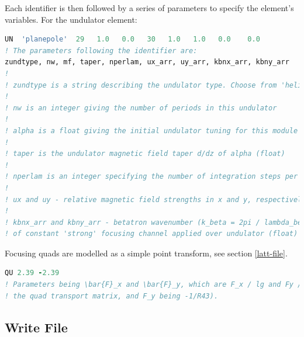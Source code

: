\documentclass[12pt]{article}%
\begin{document}
Each identifier is then followed by a series of parameters to specify the element's variables. For the undulator element:

\begin{lstlisting}[language=fortran, caption=Undulator identifier and specification]
UN  'planepole'  29   1.0   0.0   30   1.0   1.0   0.0    0.0
! The parameters following the identifier are:
zundtype, nw, mf, taper, nperlam, ux_arr, uy_arr, kbnx_arr, kbny_arr
!
! zundtype is a string describing the undulator type. Choose from 'helical', 'planepole', 'curved', or '' (blank string)
!
! nw is an integer giving the number of periods in this undulator
!
! alpha is a float giving the initial undulator tuning for this module aw/aw0,
!
! taper is the undulator magnetic field taper d/dz of alpha (float)
!
! nperlam is an integer specifying the number of integration steps per undulator period to be used in this undulator
!
! ux and uy - relative magnetic field strengths in x and y, respectively (float)
!
! kbnx_arr and kbny_arr - betatron wavenumber (k_beta = 2pi / lambda_beta)
! of constant 'strong' focusing channel applied over undulator (float)
\end{lstlisting}

Focusing quads are modelled as a simple point transform, see section \ref{latt-file}.

\begin{lstlisting}[language=fortran, caption=Quadrupole identifier and specification]
QU 2.39 -2.39
! Parameters being \bar{F}_x and \bar{F}_y, which are F_x / lg and Fy / lg, respectively. (F_x being -1/R21 of
! the quad transport matrix, and F_y being -1/R43).

\end{lstlisting}




\newpage

\subsection{Write File}
\end{document}
